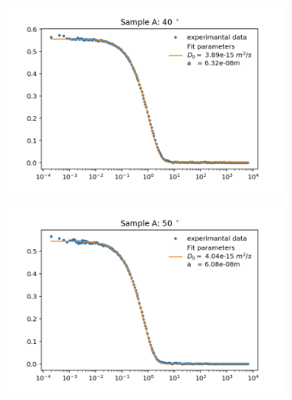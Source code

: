 \documentclass[]{article}
\begin{document}
\begin{figure}[!h]
\medskip
\begin{subfigure}{0.48\textwidth}
\includegraphics[width=\linewidth]{Plots/A/40.png}
\end{subfigure}
\begin{subfigure}[c]{0.48\linewidth}
\includegraphics[width=\linewidth]{Plots/A/50.png}
\end{subfigure}


\end{figure}
\end{document}
